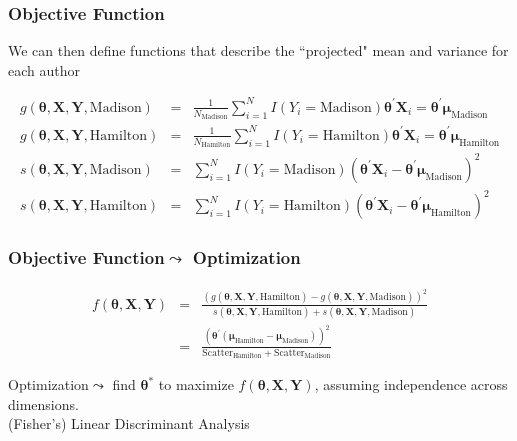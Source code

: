 \documentclass{beamer}
\numberwithin{equation}{section}
\begin{document}
\begin{frame}
\frametitle{Objective Function}

\begin{small}

We can then define functions that describe the ``projected" mean and variance for each author

\begin{eqnarray}
g(\boldsymbol{\theta}, \boldsymbol{X}, \boldsymbol{Y},  \text{Madison}) & = & \frac{1}{N_{\text{Madison}}} \sum_{i= 1}^{N}  I(Y_{i} = \text{Madison} ) \boldsymbol{\theta}^{'}\boldsymbol{X}_{i}  = \boldsymbol{\theta}^{'} \boldsymbol{\mu}_{\text{Madison}} \nonumber  \\
g(\boldsymbol{\theta}, \boldsymbol{X}, \boldsymbol{Y},  \text{Hamilton}) & = & \frac{1}{N_{\text{Hamilton}}} \sum_{i= 1}^{N}  I(Y_{i} = \text{Hamilton} ) \boldsymbol{\theta}^{'}\boldsymbol{X}_{i}  = \boldsymbol{\theta}^{'} \boldsymbol{\mu}_{\text{Hamilton}} \nonumber  \\
s(\boldsymbol{\theta}, \boldsymbol{X}, \boldsymbol{Y},  \text{Madison}) & = & \sum_{i=1}^{N} I(Y_{i} = \text{Madison} ) (\boldsymbol{\theta}^{'} \boldsymbol{X}_{i} - \boldsymbol{\theta}^{'} \boldsymbol{\mu}_{\text{Madison}})^2 \nonumber \\
s(\boldsymbol{\theta}, \boldsymbol{X}, \boldsymbol{Y},  \text{Hamilton}) & = & \sum_{i=1}^{N} I(Y_{i} = \text{Hamilton} ) (\boldsymbol{\theta}^{'} \boldsymbol{X}_{i} - \boldsymbol{\theta}^{'} \boldsymbol{\mu}_{\text{Hamilton}})^2 \nonumber
\end{eqnarray}


\end{small}


\end{frame}

\begin{frame}
\frametitle{Objective Function$\leadsto$ Optimization}

\begin{eqnarray}
f(\boldsymbol{\theta}, \boldsymbol{X}, \boldsymbol{Y} ) & = & \frac{\left(g(\boldsymbol{\theta}, \boldsymbol{X}, \boldsymbol{Y},  \text{Hamilton}) - g(\boldsymbol{\theta}, \boldsymbol{X}, \boldsymbol{Y},  \text{Madison}) \right)^2}{s(\boldsymbol{\theta}, \boldsymbol{X}, \boldsymbol{Y},  \text{Hamilton})  + s(\boldsymbol{\theta}, \boldsymbol{X}, \boldsymbol{Y},  \text{Madison}) } \nonumber\\
& =&  \frac{\left(\boldsymbol{\theta}^{'} ( \boldsymbol{\mu}_{\text{Hamilton}} - \boldsymbol{\mu}_{\text{Madison}})     \right)^2  }{\text{Scatter}_{\text{Hamilton}} + \text{Scatter}_{\text{Madison}}    } \nonumber
\end{eqnarray}


\alert{Optimization}$\leadsto$ find $\boldsymbol{\theta}^{*}$ to maximize $f(\boldsymbol{\theta}, \boldsymbol{X}, \boldsymbol{Y} ) $, assuming independence across dimensions.\\

\alert{(Fisher's) Linear Discriminant Analysis}



\end{frame}
\end{document}
